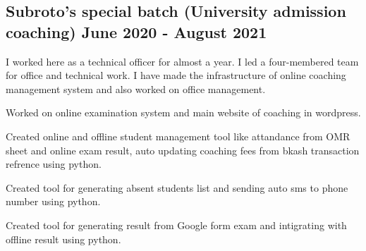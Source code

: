 \documentclass[a4paper,12pt]{article}
\begin{document}


\subsection{{Subroto's special batch (University admission coaching) \hfill June 2020 - August 2021}}
\vspace*{3pt}
I worked here as a technical officer for almost a year. I led a four-membered team for office and technical work. I have made the infrastructure of online coaching management system and also worked on office management. 
\begin{zitemize}
\item Worked on online examination system and main website of coaching in wordpress. 
\item Created online and offline student management tool like attandance from OMR sheet and online exam result,  auto updating coaching fees from bkash transaction refrence using python.
\item Created tool for generating absent students list and sending auto sms to phone number using python.
\item Created tool for generating result from Google form exam and intigrating with offline result using python.
\end{zitemize}
\end{document}

